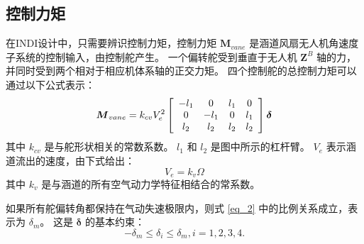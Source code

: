 \subsection{控制力矩}
在INDI设计中，只需要辨识控制力矩，控制力矩 ${{\boldsymbol{M}}_{vane}} $ 是涵道风扇无人机角速度子系统的控制输入，由控制舵产生。 一个偏转舵受到垂直于无人机 ${{\boldsymbol{Z}}^{B}}$ 轴的力，并同时受到两个相对于相应机体系轴的正交力矩。 四个控制舵的总控制力矩可以通过以下公式表示：
\begin{equation}
{{\boldsymbol{M}}_{vane}} = {k_{cv}}V_e^2\left[ {\begin{array}{*{20}{c}}
	{{\rm{ - }}{l_1}}&0&{{l_1}}&0\\
	0&{{\rm{ - }}{l_1}}&0&{{l_1}}\\
	{{l_2}}&{{l_2}}&{{l_2}}&{{l_2}}
	\end{array}} \right]{\boldsymbol{\delta }}
\label{eq_2}
\end{equation}
其中 $ {{k}_{cv}} $ 是与舵形状相关的常数系数。 $ {{l}_{1}} $ 和 $ {{l}_{2}} $ 是图中所示的杠杆臂。 ${{V}_{e}}$ 表示涵道流出的速度，由下式给出：
\begin{equation}
	{V_e} = {k_v}\Omega 
	\label{eq_3}
\end{equation}
其中 $ {{k}_{v}} $ 是与涵道的所有空气动力学特征相结合的常系数。 

如果所有舵偏转角都保持在气动失速极限内，则式 \eqref{eq_2} 中的比例关系成立，表示为 $ {{\delta }_{m}} $。 这是 ${\boldsymbol \delta}$ 的基本约束：
\begin{equation} 
	- {\delta _m} \le {\delta _i} \le {\delta _m},   i = 1,2,3,4.
	\label{eq_4}
\end{equation}

